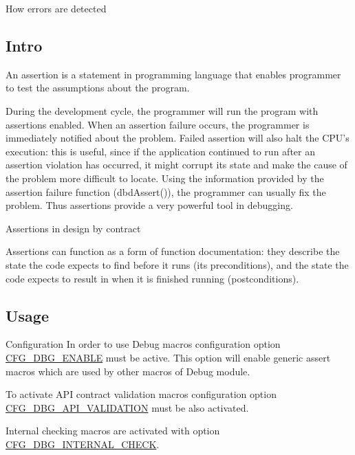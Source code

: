 How errors are detected

\par
\par
\par
\hypertarget{errors_errors_intro}{}\subsection{Intro}\label{errors_errors_intro}
An assertion is a statement in programming language that enables programmer to test the assumptions about the program.

During the development cycle, the programmer will run the program with assertions enabled. When an assertion failure occurs, the programmer is immediately notified about the problem. Failed assertion will also halt the C\-P\-U's execution\-: this is useful, since if the application continued to run after an assertion violation has occurred, it might corrupt its state and make the cause of the problem more difficult to locate. Using the information provided by the assertion failure function (dbd\-Assert()), the programmer can usually fix the problem. Thus assertions provide a very powerful tool in debugging.

\begin{DoxyParagraph}{Assertions in design by contract}

\end{DoxyParagraph}
Assertions can function as a form of function documentation\-: they describe the state the code expects to find before it runs (its preconditions), and the state the code expects to result in when it is finished running (postconditions).\hypertarget{errors_errors_usage}{}\subsection{Usage}\label{errors_errors_usage}
\begin{DoxyParagraph}{Configuration}
In order to use Debug macros configuration option \hyperlink{group__dbg__cfg_ga2ee37a5fa7efdba7d0014328e6c623a8}{C\-F\-G\-\_\-\-D\-B\-G\-\_\-\-E\-N\-A\-B\-L\-E} must be active. This option will enable generic assert macros which are used by other macros of Debug module.
\end{DoxyParagraph}
To activate A\-P\-I contract validation macros configuration option \hyperlink{group__dbg__cfg_ga64e39c477ef9d900b82585150329e3f0}{C\-F\-G\-\_\-\-D\-B\-G\-\_\-\-A\-P\-I\-\_\-\-V\-A\-L\-I\-D\-A\-T\-I\-O\-N} must be also activated.

Internal checking macros are activated with option \hyperlink{group__dbg__cfg_ga530daa344716eca7cf87075dd7a8fca1}{C\-F\-G\-\_\-\-D\-B\-G\-\_\-\-I\-N\-T\-E\-R\-N\-A\-L\-\_\-\-C\-H\-E\-C\-K}. 
